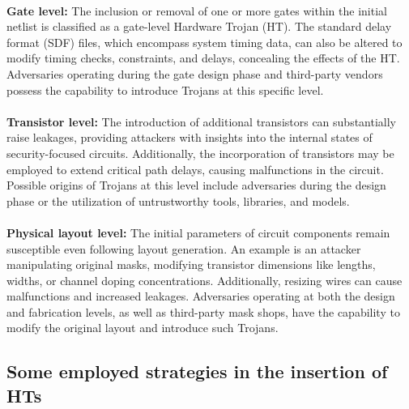 \paragraph*{}
\textbf{Gate level:} The inclusion or removal of one or more gates within the initial netlist is classified as a gate-level Hardware Trojan (HT). The standard delay format (SDF) files, which encompass system timing data, can also be altered to modify timing checks, constraints, and delays, concealing the effects of the HT. Adversaries operating during the gate design phase and third-party vendors possess the capability to introduce Trojans at this specific level.
\paragraph*{}
\textbf{Transistor level:} The introduction of additional transistors can substantially raise leakages, providing attackers with insights into the internal states of security-focused circuits. Additionally, the incorporation of transistors may be employed to extend critical path delays, causing malfunctions in the circuit. Possible origins of Trojans at this level include adversaries during the design phase or the utilization of untrustworthy tools, libraries, and models.
\paragraph*{}
\textbf{Physical layout level:} The initial parameters of circuit components remain susceptible even following layout generation. An example is an attacker manipulating original masks, modifying transistor dimensions like lengths, widths, or channel doping concentrations. Additionally, resizing wires can cause malfunctions and increased leakages. Adversaries operating at both the design and fabrication levels, as well as third-party mask shops, have the capability to modify the original layout and introduce such Trojans.
\subsection{Some employed strategies in the insertion of HTs}

